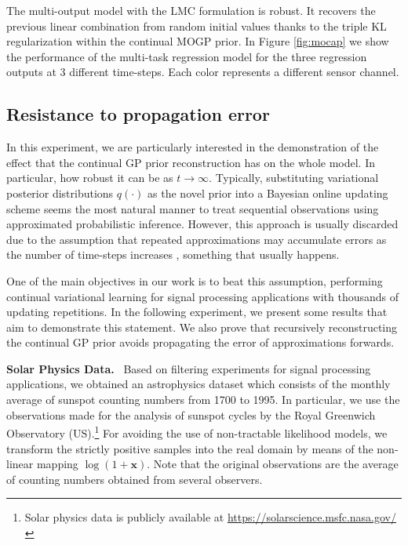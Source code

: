 \documentclass[]{article}
\newcommand{\xc}{\bm{x}}
\begin{document}
The multi-output model with the LMC formulation is robust. It recovers the previous linear combination from random initial values thanks to the triple KL regularization within the continual MOGP prior. In Figure \ref{fig:mocap} we show the performance of the multi-task regression model for the three regression outputs at 3 different time-steps. Each color represents a different sensor channel. 

\subsection{Resistance to propagation error}

In this experiment, we are particularly interested in the demonstration of the effect that the continual GP prior reconstruction has on the whole model. In particular, how robust it can be as $t\rightarrow \infty$. Typically, substituting variational posterior distributions $q(\cdot)$ as the novel prior into a Bayesian online updating scheme seems the most natural manner to treat sequential observations using approximated probabilistic inference. However, this approach is usually discarded due to the assumption that repeated approximations may accumulate errors as the number of time-steps increases \citep{nguyen2017variational}, something that usually happens. 

One of the main objectives in our work is to beat this assumption, performing continual variational learning for signal processing applications with thousands of updating repetitions. In the following experiment, we present some results that aim to demonstrate this statement. We also prove that recursively reconstructing the continual GP prior avoids propagating the error of approximations forwards.

\textbf{Solar Physics Data.}~ Based on filtering experiments for signal processing applications, we obtained an astrophysics dataset which consists of the monthly average of sunspot counting numbers from 1700 to 1995. In particular, we use the observations made for the analysis of sunspot cycles by the Royal Greenwich Observatory (US).\footnote{Solar physics data is publicly available at \url{https://solarscience.msfc.nasa.gov/}} For avoiding the use of non-tractable likelihood models, we transform the strictly positive samples into the real domain by means of the non-linear mapping $\log(1+\xc)$. Note that the original observations are the average of counting numbers obtained from several observers. 
\end{document}
